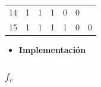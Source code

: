 \begin{center}
\begin{tabular}{ccccccc}
\multicolumn{1}{c|}{14}                          & 1                         & 1                         & 1                         & \multicolumn{1}{c|}{0}                         & \multicolumn{1}{c|}{0}                             &                       \\
\multicolumn{1}{c|}{15}                          & 1                         & 1                         & 1                         & \multicolumn{1}{c|}{1}                         & \multicolumn{1}{c|}{0}                             & \multirow{-2}{*}{0}  
\end{tabular}
\end{center}
\begin{itemize}[nosep]\item\textbf{Implementación}\end{itemize}
\newpage
\subsubsection{$f_c$}

